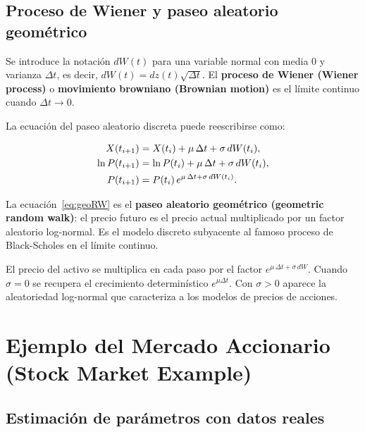 \documentclass[12pt]{article}
\begin{document}
\subsection{Proceso de Wiener y paseo aleatorio geom\'etrico}

Se introduce la notaci\'on $dW(t)$ para una variable normal con media $0$ y
varianza $\Delta t$, es decir, $dW(t) = dz(t)\sqrt{\Delta t}$.
El \textbf{proceso de Wiener (Wiener process)} o \textbf{movimiento browniano
(Brownian motion)} es el l\'imite continuo cuando $\Delta t \to 0$.

La ecuaci\'on del paseo aleatorio discreta puede reescribirse como:

\begin{align}
  X(t_{i+1}) &= X(t_i) + \mu\,\Delta t + \sigma\,dW(t_i), \notag \\
  \ln P(t_{i+1}) &= \ln P(t_i) + \mu\,\Delta t + \sigma\,dW(t_i), \notag \\
  P(t_{i+1}) &= P(t_i)\,e^{\mu\,\Delta t + \sigma\,dW(t_i)}.
  \label{eq:geoRW}
\end{align}

\begin{intuicionmat}
La ecuaci\'on~\eqref{eq:geoRW} es el \textbf{paseo aleatorio geom\'etrico
(geometric random walk)}: el precio futuro es el precio actual multiplicado por
un factor aleatorio log-normal. Es el modelo discreto subyacente al famoso
proceso de Black-Scholes en el l\'imite continuo.
\end{intuicionmat}

\begin{intuicion}
El precio del activo se multiplica en cada paso por el factor
$e^{\mu\,\Delta t + \sigma\,dW}$. Cuando $\sigma = 0$ se recupera el crecimiento
determin\'istico $e^{\mu\Delta t}$. Con $\sigma > 0$ aparece la aleatoriedad
log-normal que caracteriza a los modelos de precios de acciones.
\end{intuicion}

\section{Ejemplo del Mercado Accionario (Stock Market Example)}

\subsection{Estimaci\'on de par\'ametros con datos reales}
\end{document}
